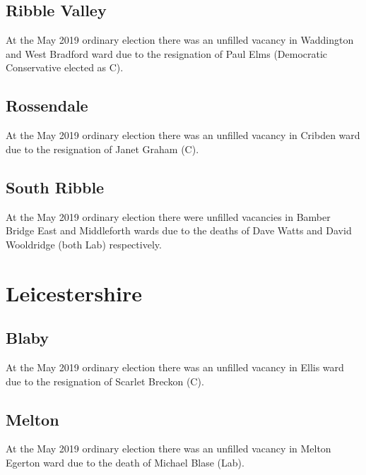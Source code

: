 \documentclass[a4paper,openany]{book}
\begin{document}
\begin{resultsiii}
\subsection*{Ribble Valley}

At the May 2019 ordinary election there was an unfilled vacancy in Waddington and West Bradford ward due to the resignation of Paul Elms (Democratic Conservative elected as C).

\subsection*{Rossendale}

At the May 2019 ordinary election there was an unfilled vacancy in Cribden ward due to the resignation of Janet Graham (C).

\subsection*{South Ribble}

At the May 2019 ordinary election there were unfilled vacancies in Bamber Bridge East and Middleforth wards due to the deaths of Dave Watts and David Wooldridge (both Lab) respectively.

\section{Leicestershire}

\subsection*{Blaby}

At the May 2019 ordinary election there was an unfilled vacancy in Ellis ward due to the resignation of Scarlet Breckon (C).

\subsection*{Melton}

At the May 2019 ordinary election there was an unfilled vacancy in Melton Egerton ward due to the death of Michael Blase (Lab).


\end{resultsiii}
\end{document}
